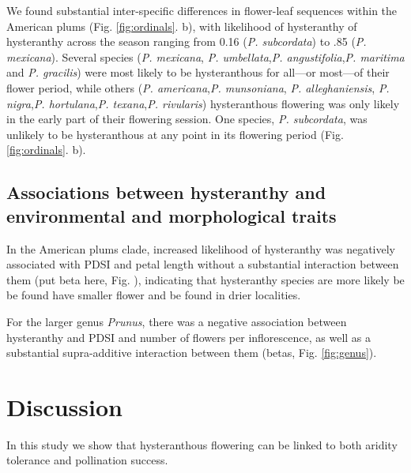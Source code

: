 \documentclass{article}[12pt]
\begin{document}
{We found substantial inter-specific differences in flower-leaf sequences within the American plums (Fig. \ref{fig:ordinals}. b), with likelihood of hysteranthy of hysteranthy across the season ranging from 0.16 (\emph{P. subcordata}) to .85 (\emph{P. mexicana}). Several species (\emph{P. mexicana}, \textit{P. umbellata},\textit{P. angustifolia},\textit{P. maritima} and \textit{P. gracilis}) were most likely to be hysteranthous for all---or most---of their flower period, while others (\textit{P. americana},\textit{P. munsoniana}, \textit{P. alleghaniensis}, \textit{P. nigra},\textit{P. hortulana},\textit{P. texana},\textit{P. rivularis}) hysteranthous flowering was only likely in the early part of their flowering session. One species, \emph{P. subcordata}, was unlikely to be hysteranthous at any point in its flowering period (Fig. \ref{fig:ordinals}. b).

\subsection*{Associations between hysteranthy and environmental and morphological traits}
In the American plums clade, increased likelihood of hysteranthy was negatively associated with PDSI and petal length  without a substantial interaction between them (put beta here, Fig. \label{fig:prunes}), indicating that hysteranthy species are more likely be be found have smaller flower and be found in drier localities.

For the larger genus \emph{Prunus}, there was a negative association between hysteranthy and PDSI and number of flowers per inflorescence, as well as a substantial supra-additive interaction between them (betas,  Fig. \ref{fig:genus}). 

\section*{Discussion}
In this study we show that hysteranthous flowering can be linked to both aridity tolerance and pollination success.%


}
\end{document}

